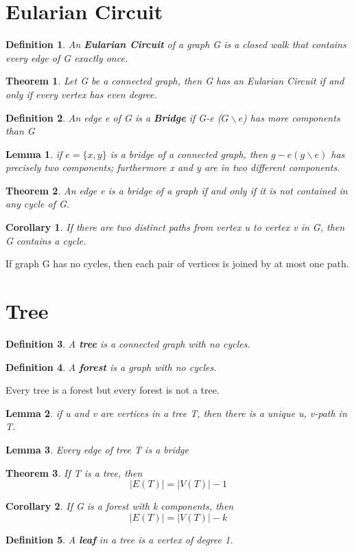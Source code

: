 \documentclass[10pt, a4paper]{article}
\newtheorem*{thm}{Theorem}
\newtheorem*{defn}{Definition}
\newtheorem*{lemma}{Lemma}
\newtheorem*{corol}{Corollary}
\begin{document}
\section{Eularian Circuit}
\begin{defn}
    An \textbf{Eularian Circuit} of a graph G is a closed walk that contains every edge of G exactly once.
\end{defn}
\begin{thm}
    Let G be a connected graph, then G has an Eularian Circuit if and only if every vertex has even degree.
\end{thm}

\begin{defn}
    An edge e of G is a \textbf{Bridge} if G-e ($G \backslash e$) has more components than G
\end{defn}
\begin{lemma}
    if $e = \{x, y\}$ is a bridge of a connected graph, then $g - e(g \backslash e)$ has precisely two components; furthermore x and y are in two different components.
\end{lemma}
\begin{thm}
    An edge e is a bridge of a graph if and only if it is not contained in any cycle of G.
\end{thm}
\begin{corol}
    If there are two distinct paths from vertex u to vertex v in G, then G contains a cycle.
\end{corol}
\begin{term}
    If graph G has no cycles, then each pair of vertices is joined by at most one path.
\end{term}


\section{Tree}
\begin{defn}
    A \textbf{tree} is a connected graph with no cycles.
\end{defn}
\begin{defn}
    A \textbf{forest} is a graph with no cycles.
\end{defn}
\begin{term}
    Every tree is a forest but every forest is not a tree.
\end{term}
\begin{lemma}
    if u and v are vertices in a tree T, then there is a unique u, v-path in T.
\end{lemma}
\begin{lemma}
    Every edge of tree T is a bridge
\end{lemma}
\begin{thm}
    If T is a tree, then 
    \[|E(T)| = |V(T)| - 1\]
\end{thm}
\begin{corol}
    If G is a forest with k components, then
    \[|E(T)| = |V(T)| - k\]
\end{corol}
\begin{defn}
    A \textbf{leaf} in a tree is a vertex of degree 1.
\end{defn}
\end{document}
